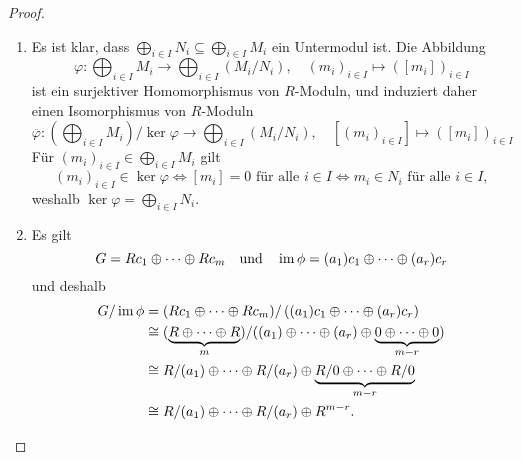 \documentclass[a4paper,10pt,numbers=noenddot]{scrartcl}
\begin{document}
\begin{proof}
  \begin{enumerate}
    \item
      Es ist klar, dass $\bigoplus_{i \in I} N_i \subseteq \bigoplus_{i \in I} M_i$ ein Untermodul ist.
      Die Abbildung
      \[
                \varphi
        \colon  \bigoplus_{i \in I} M_i \to \bigoplus_{i \in I} (M_i / N_i),
        \quad
                (m_i)_{i \in I} \mapsto ([m_i])_{i \in I}
      \]
      ist ein surjektiver Homomorphismus von $R$-Moduln, und induziert daher einen Isomorphismus von $R$-Moduln
      \[
                \overline{\varphi}
        \colon  \left( \bigoplus_{i \in I} M_i \right) / \ker \varphi \to \bigoplus_{i \in I} (M_i / N_i),
        \quad
                [(m_i)_{i \in I}] \mapsto ([m_i])_{i \in I}
      \]
      Für $(m_i)_{i \in I} \in \bigoplus_{i \in I} M_i$ gilt
      \[
              (m_i)_{i \in I} \in \ker \varphi
        \iff  \text{$[m_i] = 0$ für alle $i \in I$}
        \iff  \text{$m_i \in N_i$ für alle $i \in I$},
      \]
      weshalb $\ker \varphi = \bigoplus_{i \in I} N_i$.
    \item
      Es gilt
      \[
          G
        = R c_1 \oplus \dotsb \oplus R c_m
      \quad\text{und}\quad
          \operatorname{im} \phi
        = (a_1) c_1 \oplus \dotsb \oplus (a_r) c_r
      \]
      und deshalb
      \begin{align*}
                G / \operatorname{im} \phi
        &=      (R c_1 \oplus \dotsb \oplus R c_m) / \left( (a_1) c_1 \oplus \dotsb \oplus (a_r) c_r \right)
        \\
        &\cong  ( \underbrace{R \oplus \dotsb \oplus R}_{m} )
                / ( (a_1) \oplus \dotsb \oplus (a_r) \oplus \underbrace{0 \oplus \dotsb \oplus 0}_{m-r} )
        \\
        &\cong  R/(a_1) \oplus \dotsb \oplus R/(a_r) \oplus \underbrace{R/0 \oplus \dotsb \oplus R/0}_{m-r}
        \\
        &\cong  R/(a_1) \oplus \dotsb \oplus R/(a_r) \oplus R^{m-r}.
      \qedhere
      \end{align*}
  \end{enumerate}
\end{proof}
\end{document}
